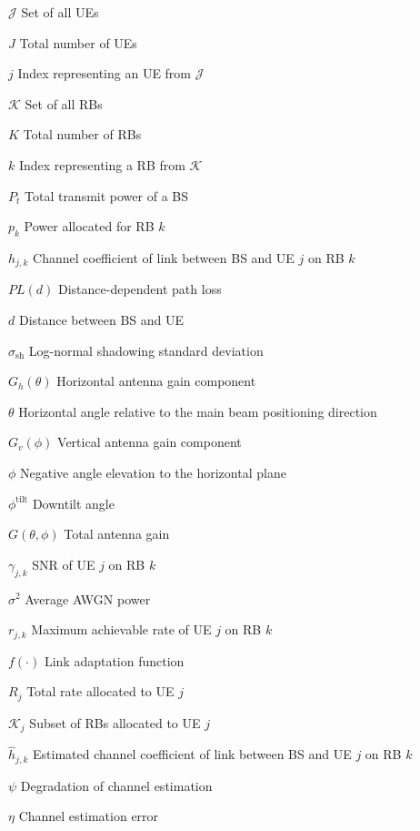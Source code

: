 \begin{simbolos} \setlength{\itemsep}{0.0001\baselineskip} \addtolength{\labelwidth}{1ex}
	\item[$ \mathcal{J} $] Set of all UEs
	\item[$ J $] Total number of UEs
	\item[$ j $] Index representing an UE from $\mathcal{J}$
	\item[$ \mathcal{K} $] Set of all RBs
	\item[$ K $] Total number of RBs
	\item[$ k $] Index representing a RB from $\mathcal{K}$
	\item[$ P_{t} $] Total transmit power of a BS
	\item[$ p_{k} $] Power allocated for RB $k$
	\item[$ h_{j, k} $] Channel coefficient of link between BS and UE $j$ on RB $k$
	\item[$ PL(d) $] Distance-dependent path loss
	\item[$ d $] Distance between BS and UE
	\item[$\sigma_{\mathrm{sh}}$] Log-normal shadowing standard deviation
	\item[$ G_h(\theta) $] Horizontal antenna gain component
	\item[$ \theta $] Horizontal angle relative to the main beam positioning direction
	\item[$ G_v(\phi) $] Vertical antenna gain component
	\item[$ \phi $] Negative angle elevation to the horizontal plane
	\item[$ \phi^\text{tilt} $] Downtilt angle
	\item[$ G(\theta, \phi) $] Total antenna gain
	\item[$ \gamma_{j, k} $] SNR of UE $j$ on RB $k$
	\item[$ \sigma^2 $] Average AWGN power
	\item[$ r_{j, k} $] Maximum achievable rate of UE $j$ on RB $k$
	\item[$f(\cdot)$] Link adaptation function
	\item[$ R_j $] Total rate allocated to UE $j$
	\item[$ \mathcal{K}_{j} $] Subset of RBs allocated to UE $j$
	\item[$ \hat{h}_{j, k} $] Estimated channel coefficient of link between BS and UE $j$ on RB $k$
	\item[$ \psi $] Degradation of channel estimation
	\item[$ \eta $] Channel estimation error

\end{simbolos}
